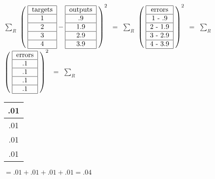\documentclass[11pt]{amsart}
\begin{document}
\bigskip
\bigskip


$\sum_R$
$\left(\;
\begin{tabular}{| c | }
\hline
  targets  \\
\hline
  1   \\
\hline
 2  \\
\hline
 3 \\
\hline
 4 \\
\hline
\end{tabular}
-
\begin{tabular}{| c | }
\hline
  outputs  \\
\hline
  .9   \\
\hline
 1.9  \\
\hline
 2.9 \\
\hline
 3.9 \\
\hline
\end{tabular}
\; \right)^2$
$=$
$\sum_R$
$\left(\;
\begin{tabular}{| c | }
\hline
  errors  \\
\hline
1 - .9   \\
\hline
2 - 1.9  \\
\hline
3 - 2.9 \\
\hline
4 - 3.9 \\
\hline
\end{tabular}
\; \right)^2$
$=$
$\sum_R$
$\left(\;
\begin{tabular}{| c | }
\hline
  errors  \\
\hline
.1   \\
\hline
.1  \\
\hline
.1 \\
\hline
.1 \\
\hline
\end{tabular}
\; \right)^2$
$=$
$\sum_R$
\begin{tabular}{| c | }
\hline
.01   \\
\hline
 .01  \\
\hline
 .01 \\
\hline
 .01 \\
\hline
\end{tabular}
$=.01+.01+.01+.01=.04$
\bigskip
\bigskip

\end{document}
